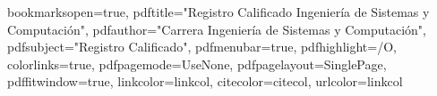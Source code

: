 \usepackage{amsmath,amssymb}             %
\usepackage{tikz}                        %
\usepackage[left=1.0in,right=1.0in,top=1.0in,bottom=1.0in,includefoot,includehead,headheight=14.33044pt]{geometry}
\raggedbottom                            %
\renewcommand{\baselinestretch}{1.05}

\usepackage[nottoc, notlof, notlot]{tocbibind}
\usepackage{minitoc}
\setcounter{minitocdepth}{2}
\mtcindent=15pt

\usepackage{aecompl}


\usepackage{ifpdf}


\usepackage{color}



\hypersetup
{
bookmarksopen=true,
pdftitle="Registro Calificado Ingeniería de Sistemas y Computación",
pdfauthor="Carrera Ingeniería de Sistemas y Computación", 
pdfsubject="Registro Calificado", %
pdfmenubar=true, %
pdfhighlight=/O, %
colorlinks=true, %
pdfpagemode=UseNone, %
pdfpagelayout=SinglePage, %
pdffitwindow=true, %
linkcolor=linkcol, %
citecolor=citecol, %
urlcolor=linkcol %
}


\setcounter{secnumdepth}{3}
\setcounter{tocdepth}{2}


\newcommand{\pd}[2]{\frac{\partial #1}{\partial #2}}
\def\abs{\operatorname{abs}}
\def\argmax{\operatornamewithlimits{arg\,max}}
\def\argmin{\operatornamewithlimits{arg\,min}}
\def\diag{\operatorname{Diag}}
\newcommand{\eqRef}[1]{(\ref{#1})}

